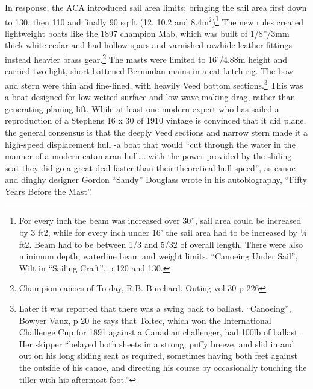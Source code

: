 \documentclass[
  letterpaper,
]{scrbook}
\begin{document}
In response, the ACA introduced sail area limits; bringing the sail area
first down to 130, then 110 and finally 90 sq ft (12, 10.2 and
8.4m\(^2\))\footnote{For every inch the beam was increased over 30'',
  sail area could be increased by 3 ft2, while for every inch under 16'
  the sail area had to be increased by ¼ ft2. Beam had to be between 1/3
  and 5/32 of overall length. There were also minimum depth, waterline
  beam and weight limits. ``Canoeing Under Sail'', Wilt in ``Sailing
  Craft'', p 120 and 130.} The new rules created lightweight boats like
the 1897 champion Mab, which was built of 1/8''/3mm thick white cedar
and had hollow spars and varnished rawhide leather fittings instead
heavier brass gear.\footnote{Champion canoes of To-day, R.B. Burchard,
  Outing vol 30 p 226} The masts were limited to 16'/4.88m height and
carried two light, short-battened Bermudan mains in a cat-ketch rig. The
bow and stern were thin and fine-lined, with heavily Veed bottom
sections.\footnote{Later it was reported that there was a swing back to
  ballast. ``Canoeing'', Bowyer Vaux, p 20 he says that Toltec, which
  won the International Challenge Cup for 1891 against a Canadian
  challenger, had 100lb of ballast. Her skipper ``belayed both sheets in
  a strong, puffy breeze, and slid in and out on his long sliding seat
  as required, sometimes having both feet against the outside of his
  canoe, and directing his course by occasionally touching the tiller
  with his aftermost foot.''} This was a boat designed for low wetted
surface and low wave-making drag, rather than generating planing lift.
While at least one modern expert who has sailed a reproduction of a
Stephens 16 x 30 of 1910 vintage is convinced that it did plane, the
general consensus is that the deeply Veed sections and narrow stern made
it a high-speed displacement hull -a boat that would ``cut through the
water in the manner of a modern catamaran hull\ldots..with the power
provided by the sliding seat they did go a great deal faster than their
theoretical hull speed'', as canoe and dinghy designer Gordon ``Sandy''
Douglass wrote in his autobiography, ``Fifty Years Before the Mast''.
\end{document}
